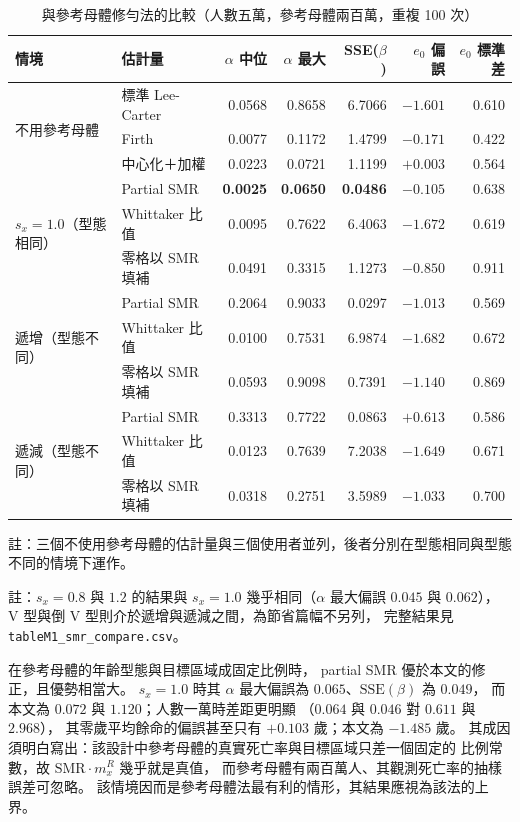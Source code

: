 \documentclass[UTF8, fontset=macnew, a4paper, 12pt]{ctexart}
\begin{document}
\begin{table}[H]
\centering
\caption{與參考母體修勻法的比較（人數五萬，參考母體兩百萬，重複 100 次）}
\footnotesize
\renewcommand{\arraystretch}{1.1}
\begin{tabular}{llrrrrr}
\toprule
情境 & 估計量 & $\alpha$ 中位 & $\alpha$ 最大 & SSE($\beta$) & $e_0$ 偏誤 & $e_0$ 標準差\\
\midrule
\multirow{3}{*}{不用參考母體}
 & 標準 Lee-Carter        & 0.0568 & 0.8658 & 6.7066 & $-1.601$ & 0.610\\
 & Firth          & 0.0077 & 0.1172 & 1.4799 & $-0.171$ & 0.422\\
 & 中心化＋加權   & 0.0223 & 0.0721 & 1.1199 & $+0.003$ & 0.564\\
\midrule
\multirow{3}{*}{$s_x=1.0$（型態相同）}
 & Partial SMR    & \textbf{0.0025} & \textbf{0.0650} & \textbf{0.0486} & $-0.105$ & 0.638\\
 & Whittaker 比值 & 0.0095 & 0.7622 & 6.4063 & $-1.672$ & 0.619\\
 & 零格以 SMR 填補 & 0.0491 & 0.3315 & 1.1273 & $-0.850$ & 0.911\\
\midrule
\multirow{3}{*}{遞增（型態不同）}
 & Partial SMR    & 0.2064 & 0.9033 & 0.0297 & $-1.013$ & 0.569\\
 & Whittaker 比值 & 0.0100 & 0.7531 & 6.9874 & $-1.682$ & 0.672\\
 & 零格以 SMR 填補 & 0.0593 & 0.9098 & 0.7391 & $-1.140$ & 0.869\\
\midrule
\multirow{3}{*}{遞減（型態不同）}
 & Partial SMR    & 0.3313 & 0.7722 & 0.0863 & $+0.613$ & 0.586\\
 & Whittaker 比值 & 0.0123 & 0.7639 & 7.2038 & $-1.649$ & 0.671\\
 & 零格以 SMR 填補 & 0.0318 & 0.2751 & 3.5989 & $-1.033$ & 0.700\\
\bottomrule
\end{tabular}

{\footnotesize 註：三個不使用參考母體的估計量與三個使用者並列，後者分別在型態相同與型態不同的情境下運作。}


\vspace{2pt}
\parbox{0.92\textwidth}{\footnotesize 註：$s_x=0.8$ 與 $1.2$ 的結果與
$s_x=1.0$ 幾乎相同（$\alpha$ 最大偏誤 $0.045$ 與 $0.062$），
V 型與倒 V 型則介於遞增與遞減之間，為節省篇幅不另列，
完整結果見 \texttt{tableM1\_smr\_compare.csv}。}
\label{tab:smr}
\end{table}

在參考母體的年齡型態與目標區域成固定比例時，
partial SMR 優於本文的修正，且優勢相當大。
$s_x=1.0$ 時其 $\alpha$ 最大偏誤為 $0.065$、$\mathrm{SSE}(\beta)$ 為 $0.049$，
而本文為 $0.072$ 與 $1.120$；人數一萬時差距更明顯
（$0.064$ 與 $0.046$ 對 $0.611$ 與 $2.968$），
其零歲平均餘命的偏誤甚至只有 $+0.103$ 歲；本文為 $-1.485$ 歲。
其成因須明白寫出：該設計中參考母體的真實死亡率與目標區域只差一個固定的
比例常數，故 $\mathrm{SMR}\cdot m^{R}_x$ 幾乎就是真值，
而參考母體有兩百萬人、其觀測死亡率的抽樣誤差可忽略。
該情境因而是參考母體法最有利的情形，其結果應視為該法的上界。
\end{document}
